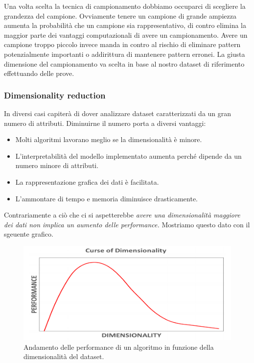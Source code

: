 Una volta scelta la tecnica di campionamento dobbiamo occuparci di scegliere la grandezza del campione. Ovviamente tenere un campione di grande ampiezza aumenta la probabilità che un campione sia rappresentativo, di contro elimina la maggior parte dei vantaggi computazionali di avere un campionamento. Avere un campione troppo piccolo invece manda in contro al rischio di eliminare pattern potenzialmente importanti o addirittura di mantenere pattern erronei. La giusta dimensione del campionamento va scelta in base al nostro dataset di riferimento effettuando delle prove.

\subsubsection{Dimensionality reduction}

In diversi casi capiterà di dover analizzare dataset caratterizzati da un gran numero di attributi. Diminuirne il numero porta a diversi vantaggi:

\begin{itemize}
	\item Molti algoritmi lavorano meglio se la dimensionalità è minore.
	\item L'interpretabilità del modello implementato aumenta perché dipende da un numero minore di attributi.
	\item La rappresentazione grafica dei dati è facilitata.
	\item L'ammontare di tempo e memoria diminuisce drasticamente.
\end{itemize}

Contrariamente a ciò che ci si aspetterebbe \textit{avere una dimensionalità maggiore dei dati non implica un aumento delle performance.}
Mostriamo questo dato con il sgeuente grafico.

\begin{figure}[H]
	\centering
	\includegraphics[height=0.35 \linewidth]{introduction/pict/performance.png}
	\caption{Andamento delle performance di un algoritmo in funzione della dimensionalità del dataset.}
\end{figure}

